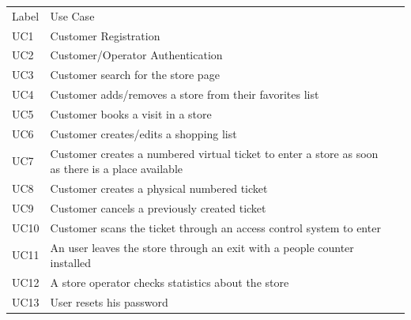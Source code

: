 \renewcommand{\arraystretch}{1.4}
\begin{tabular}{C{2cm}L{10.5cm}C{2.6cm}}
    Label & Use Case                                                                                          \\
    UC1   & Customer Registration                                                                             \\
    UC2   & Customer/Operator Authentication                                                                  \\
    UC3   & Customer search for the store page                                                                \\
    UC4   & Customer adds/removes a store from their favorites list                                           \\
    UC5   & Customer books a visit in a store                                                                 \\
    UC6   & Customer creates/edits a shopping list                                                            \\
    UC7   & Customer creates a numbered virtual ticket to enter a store as soon as there is a place available \\
    UC8   & Customer creates a physical numbered ticket                                                       \\
    UC9   & Customer cancels a previously created ticket                                                      \\
    UC10  & Customer scans the ticket through an access control system to enter                               \\
    UC11  & An user leaves the store through an exit with a people counter installed                          \\
    UC12  & A store operator checks statistics about the store                                                \\
    UC13  & User resets his password                                                                          \\
\end{tabular}
\medskip
